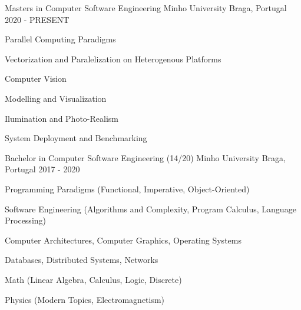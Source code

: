 


\begin{cventries}


\cventry
{Masters in Computer Software Engineering} %
{Minho University} %
{Braga, Portugal} %
{2020 - PRESENT} %
{ %
\begin{cvitems}
\item{Parallel Computing Paradigms}
\item{Vectorization and Paralelization on Heterogenous Platforms}
\item{Computer Vision}
\item{Modelling and Visualization}
\item{Ilumination and Photo-Realism}
\item{System Deployment and Benchmarking}
\end{cvitems}
}


\cventry
  {Bachelor in Computer Software Engineering (14/20)} %
{Minho University} %
{Braga, Portugal} %
{2017 - 2020} %
{ %
\begin{cvitems}
\item{Programming Paradigms (Functional, Imperative, Object-Oriented)}
\item{Software Engineering (Algorithms and Complexity, Program Calculus,
  Language Processing)}
\item{Computer Architectures, Computer Graphics, Operating Systems}
\item{Databases, Distributed Systems, Networks}
\item{Math (Linear Algebra, Calculus, Logic, Discrete)}
\item{Physics (Modern Topics, Electromagnetism)}
\end{cvitems}
}



\end{cventries}
